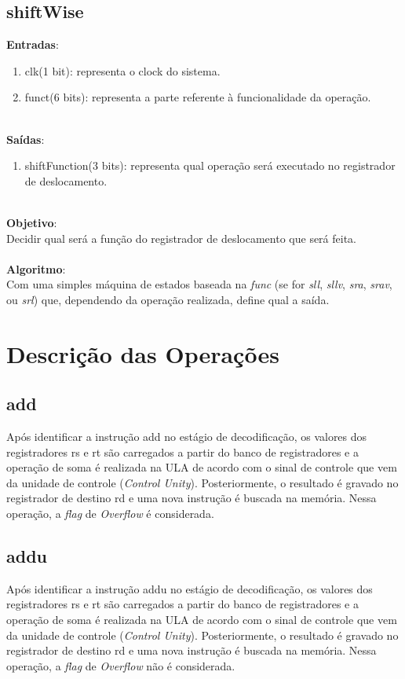 \documentclass{article}
\begin{document}
    \subsection{shiftWise}
    \textbf{Entradas}:
   \begin{enumerate}
        \item clk(1 bit): representa o clock do sistema.
        \item funct(6 bits): representa a parte referente à funcionalidade da operação.\\
    \end{enumerate}
    \\
    \textbf{Saídas}:
    \begin{enumerate}
        \item shiftFunction(3 bits): representa qual operação será executado no registrador de deslocamento.\\
    \end{enumerate}
    \\
    \textbf{Objetivo}:\\
    Decidir qual será a função do registrador de deslocamento que será feita.
    \\
    \\
    \textbf{Algoritmo}:\\
    Com uma simples máquina de estados baseada na {\it func} (se for {\it sll}, {\it sllv}, {\it sra}, {\it srav}, ou {\it srl}) que, dependendo da operação realizada, define qual a saída.
    
    \newpage
    \section{Descrição das Operações}
    \subsection{add}
    Após identificar a instrução add no estágio de decodificação, os valores dos registradores rs e rt são carregados a partir do banco de registradores e a operação de soma é realizada na ULA de acordo com o sinal de controle que vem da unidade de controle ({\it Control Unity}). Posteriormente, o resultado é gravado no registrador de destino rd e uma nova instrução é buscada na memória. Nessa operação, a {\it flag} de {\it Overflow} é considerada.
    \\
    \subsection{addu}
    Após identificar a instrução addu no estágio de decodificação, os valores dos registradores rs e rt são carregados a partir do banco de registradores e a operação de soma é realizada na ULA de acordo com o sinal de controle que vem da unidade de controle ({\it Control Unity}). Posteriormente, o resultado é gravado no registrador de destino rd e uma nova instrução é buscada na memória. Nessa operação, a {\it flag} de {\it Overflow} não é considerada.
    \\
\end{document}
